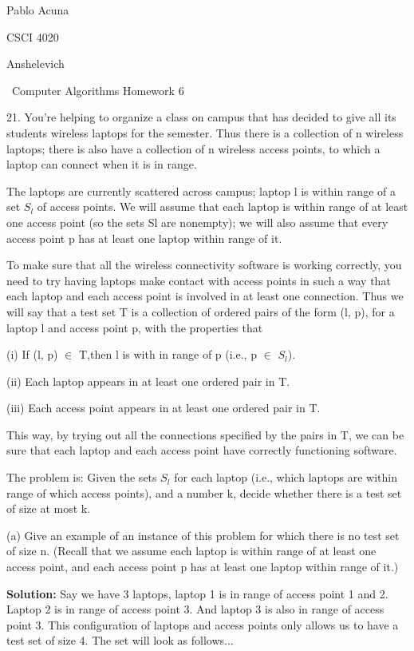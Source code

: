 \documentclass{article}
\begin{document}
\clearpage


Pablo Acuna

CSCI 4020

Anshelevich

{\centering\ Computer Algorithms Homework 6 \par}


21. You’re helping to organize a class on campus that has decided to give all
its students wireless laptops for the semester. Thus there is a collection of
n wireless laptops; there is also have a collection of n wireless access points,
to which a laptop can connect when it is in range.

The laptops are currently scattered across campus; laptop l is within range of
a set $S_l$ of access points. We will assume that each laptop is within range of
at least one access point (so the sets Sl are nonempty); we will also assume
that every access point p has at least one laptop within range of it.

To make sure that all the wireless connectivity software is working correctly,
you need to try having laptops make contact with access points in such a way
that each laptop and each access point is involved in at least one connection.
Thus we will say that a test set T is a collection of ordered pairs of the form
(l, p), for a laptop l and access point p, with the properties that

(i) If (l, p) $\in$ T,then l is with in range of p (i.e., p $\in$ $S_l$).

(ii) Each laptop appears in at least one ordered pair in T.

(iii) Each access point appears in at least one ordered pair in T.

This way, by trying out all the connections specified by the pairs in T, we
can be sure that each laptop and each access point have correctly functioning
software.

The problem is: Given the sets $S_l$ for each laptop
(i.e., which laptops are within range of which access points), and a number k,
decide whether there is a test set of size at most k. \newline

(a) Give an example of an instance of this problem for which there is no test
set of size n. (Recall that we assume each laptop is within range of at least
one access point, and each access point p has at least one laptop within range
of it.) \newline

\textbf{Solution:} Say we have 3 laptops, laptop 1 is in range of access point 1 and 2.
Laptop 2 is in range of access point 3.  And laptop 3 is also in range of access point 3.
This configuration of laptops and access points only allows us to have a test set of size 4.
The set will look as follows...
\end{document}
